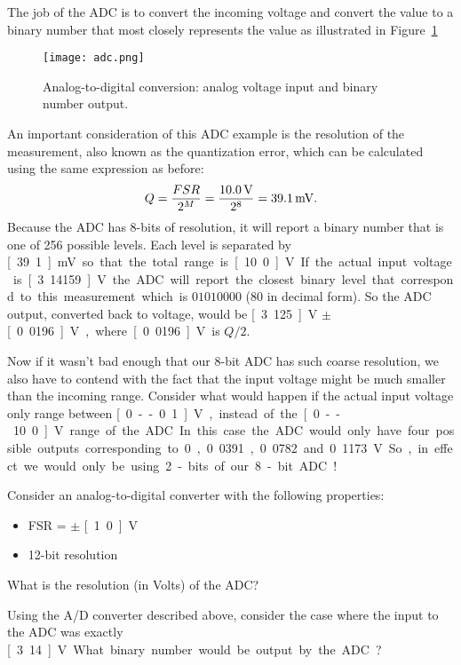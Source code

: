 The job of the ADC is to convert the incoming voltage and convert the value to a binary number that most closely represents the value as illustrated in Figure~\ref{f:adc}
\begin{figure}[hbt!]
\centering
\texttt{[image: adc.png]}
\caption{Analog-to-digital conversion: analog voltage input and binary number output.}
\label{f:adc}
\end{figure}
An important consideration of this ADC example is the resolution of the measurement, also known as the quantization error, which can be calculated using the same expression as before:
\begin{equation}
Q = \frac{FSR}{2^M} = \frac{\unit[10.0]{V}}{2^8} = \unit[39.1]{mV}.
\end{equation}
Because the ADC has 8-bits of resolution, it will report a binary number that is one of 256 possible levels.  Each level is separated by \unit[39.1]{mV} so that the total range is \unit[10.0]{V}.  If the actual input voltage is \unit[3.14159]{V} the ADC will report the closest binary level that correspond to this measurement which is $01010000$ (80 in decimal form).  So the ADC output, converted back to voltage, would be \unit[3.125]{V} $\pm$ \unit[0.0196]{V}, where \unit[0.0196]{V} is $Q/2$.  

Now if it wasn't bad enough that our 8-bit ADC has such coarse resolution, we also have to contend with the fact that the input voltage might be much smaller than the incoming range.  Consider what would happen if the actual input voltage only range between \unit[0--0.1]{V}, instead of the \unit[0--10.0]{V} range of the ADC.  In this case the ADC would only have four possible outputs corresponding to 0, 0.0391, 0.0782 and 0.1173 V.  So, in effect we would only be using 2-bits of our 8-bit ADC!

\begin{ex}
Consider an analog-to-digital converter with the following properties:
\begin{itemize}
\item FSR = $\pm$ \unit[1.0]{V}
\item 12-bit resolution
\end{itemize}
What is the resolution (in Volts) of the ADC?  
\end{ex}
\begin{ex}
Using the A/D converter described above, consider the case where the input to the ADC was exactly \unit[3.14]{V}. What binary number would be output by the ADC?
\end{ex}

